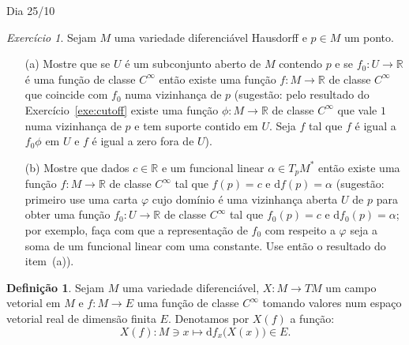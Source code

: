 \documentclass[oneside,11pt]{amsart}
\newcommand{\R}{\mathds R}
\newcommand{\dd}{\mathrm d}
\theoremstyle{remark}\newtheorem{exercise}{Exercício}[section]
\theoremstyle{plain}\newtheorem{teo}{Teorema}[section]
\theoremstyle{plain}\newtheorem{lem}[teo]{Lema}
\theoremstyle{plain}\newtheorem{prop}[teo]{Proposição}
\theoremstyle{definition}\newtheorem{defin}[teo]{Definição}
\theoremstyle{remark}\newtheorem{rem}[teo]{Observação}
\theoremstyle{definition}\newtheorem{example}[teo]{Exemplo}
\numberwithin{equation}{section}
\begin{document}
\begin{section}{Dia 25/10}
\begin{exercise}\label{exe:difdada}
Sejam $M$ uma variedade diferenciável Hausdorff e $p\in M$ um ponto.
\begin{itemize}
\item[(a)] Mostre que se $U$ é um subconjunto aberto de $M$ contendo $p$ e se $f_0:U\to\R$ é uma função de classe $C^\infty$ então existe uma função
$f:M\to\R$ de classe $C^\infty$ que coincide com $f_0$ numa vizinhança de $p$ (sugestão: pelo resultado do Exercício~\ref{exe:cutoff} existe
uma função $\phi:M\to\R$ de classe $C^\infty$ que vale $1$ numa vizinhança de $p$ e tem suporte contido em $U$. Seja $f$ tal que $f$ é igual a $f_0\phi$
em $U$ e $f$ é igual a zero fora de $U$).
\item[(b)] Mostre que dados $c\in\R$ e um funcional linear $\alpha\in T_pM^*$ então existe uma função $f:M\to\R$ de classe $C^\infty$ tal
que $f(p)=c$ e $\dd f(p)=\alpha$ (sugestão: primeiro use uma carta $\varphi$ cujo domínio é uma vizinhança aberta $U$ de $p$ para obter uma função
$f_0:U\to\R$ de classe $C^\infty$ tal que $f_0(p)=c$ e $\dd f_0(p)=\alpha$; por exemplo, faça com que a representação de $f_0$ com respeito a $\varphi$
seja a soma de um funcional linear com uma constante. Use então o resultado do item~(a)).
\end{itemize}
\end{exercise}

\begin{defin}\label{thm:defXdef}
Sejam $M$ uma variedade diferenciável, $X:M\to TM$ um campo vetorial em $M$ e $f:M\to E$ uma função de classe $C^\infty$ tomando valores num espaço
vetorial real de dimensão finita $E$. Denotamos por $X(f)$ a função:
\[X(f):M\ni x\longmapsto\dd f_x\big(X(x)\big)\in E.\]
\end{defin}


\end{section}
\end{document}
